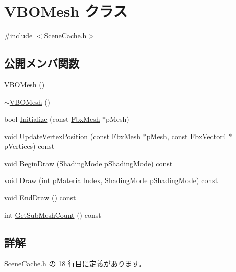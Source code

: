 \hypertarget{class_v_b_o_mesh}{}\section{V\+B\+O\+Mesh クラス}
\label{class_v_b_o_mesh}


{\ttfamily \#include $<$Scene\+Cache.\+h$>$}

\subsection*{公開メンバ関数}
\begin{DoxyCompactItemize}
\item 
\hyperlink{class_v_b_o_mesh_ab88ca42807ca0c7dca8a9a661785e594}{V\+B\+O\+Mesh} ()
\item 
\hyperlink{class_v_b_o_mesh_a96e0ef2a5ae81cb9b5741bf51b12846c}{$\sim$\+V\+B\+O\+Mesh} ()
\item 
bool \hyperlink{class_v_b_o_mesh_a352852754a2a04d4328ec1b874c9eec4}{Initialize} (const \hyperlink{class_fbx_mesh}{Fbx\+Mesh} $\ast$p\+Mesh)
\item 
void \hyperlink{class_v_b_o_mesh_a2e8f99b6619cf91b1f8fbf6f5224fcd4}{Update\+Vertex\+Position} (const \hyperlink{class_fbx_mesh}{Fbx\+Mesh} $\ast$p\+Mesh, const \hyperlink{class_fbx_vector4}{Fbx\+Vector4} $\ast$p\+Vertices) const
\item 
void \hyperlink{class_v_b_o_mesh_a6b9fc2d81780037985624151a1ae1df9}{Begin\+Draw} (\hyperlink{_gl_functions_8h_a474716bb9224d44d614704a0bd331d99}{Shading\+Mode} p\+Shading\+Mode) const
\item 
void \hyperlink{class_v_b_o_mesh_ad01452c36fbf1b0f4daa3c605a8c8126}{Draw} (int p\+Material\+Index, \hyperlink{_gl_functions_8h_a474716bb9224d44d614704a0bd331d99}{Shading\+Mode} p\+Shading\+Mode) const
\item 
void \hyperlink{class_v_b_o_mesh_a0d8c1a2cc65ca7e94c50fb67d7713898}{End\+Draw} () const
\item 
int \hyperlink{class_v_b_o_mesh_a3898fc45e87428031716383b43923e2c}{Get\+Sub\+Mesh\+Count} () const
\end{DoxyCompactItemize}


\subsection{詳解}


 Scene\+Cache.\+h の 18 行目に定義があります。




